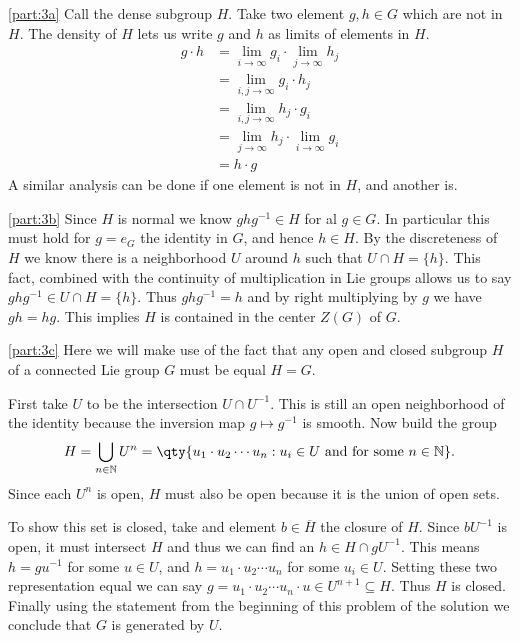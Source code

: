 \documentclass[pages,boxes,color=WildStrawberry]{homework}
\newcommand{\N}{\mathbb{N}}
\newcommand{\1}{\mathbb{1}}
\begin{document}
\begin{solution}
	\ref{part:3a}
	Call the dense subgroup $H$. Take two element $g, h\in G$ which are not in $H$. The density of $H$ lets us write $g$ and $h$ as limits of elements in $H$.
	\begin{align*}
		g\cdot h & = \lim_{i\to\infty} g_i \cdot \lim_{j\to\infty} h_j \\
		         & = \lim_{i,j\to\infty}g_i\cdot h_j                   \\
		         & = \lim_{i,j\to\infty}h_j\cdot g_i                   \\
		         & = \lim_{j\to\infty}h_j\cdot\lim_{i\to\infty}g_i     \\
		         & = h\cdot g
	\end{align*}
	A similar analysis can be done if one element is not in $H$, and another is.

	\ref{part:3b}
	Since $H$ is normal we know $ghg^{-1}\in H$ for al $g\in G$. In particular this must hold for $g = e_G$ the identity in $G$, and hence $h\in H$. By the discreteness of $H$ we know there is a neighborhood $U$ around $h$ such that $U\cap H = \{h\}$. This fact, combined with the continuity of multiplication in Lie groups allows us to say $ghg^{-1}\in U\cap H = \{h\}$. Thus $ghg^{-1} = h$ and by right multiplying by $g$ we have $gh = hg$. This implies $H$ is contained in the center $Z(G)$ of $G$.

	\ref{part:3c}
	Here we will make use of the fact that any open and closed subgroup $H$ of a connected Lie group $G$ must be equal $H = G$.

	First take $U$ to be the intersection $U\cap U^{-1}$. This is still an open neighborhood of the identity because the inversion map $g\mapsto g^{-1}$ is smooth. Now build the group
	\begin{equation*}
		H = \bigcup_{n\in\N}U^n = \qty{u_1\cdot u_2\cdots u_n : u_i\in U \text{ and for some }n\in\N}.
	\end{equation*}
	Since each $U^n$ is open, $H$ must also be open because it is the union of open sets.

	To show this set is closed, take and element $b\in\overline{H}$ the closure of $H$. Since $bU^{-1}$ is open, it must intersect $H$ and thus we can find an $h\in H\cap gU^{-1}$. This means $h = gu^{-1}$ for some $u\in U$, and $h = u_1\cdot u_2\cdots u_n$ for some $u_i\in U$. Setting these two representation equal we can say $g = u_1\cdot u_2\cdots u_n\cdot u\in U^{n+1}\subseteq H$. Thus $H$ is closed. Finally using the statement from the beginning of this problem of the solution we conclude that $G$ is generated by $U$.
\end{solution}
\end{document}
